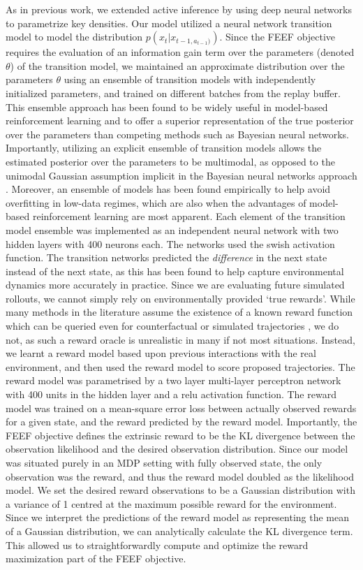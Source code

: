 As in previous work, we extended active inference by using deep neural networks to parametrize key densities. Our model utilized a neural network transition model to model the distribution $p(x_t | x_{t-1, a_{t-1})})$. Since the FEEF objective requires the evaluation of an information gain term over the parameters (denoted $\theta$) of the transition model, we maintained an approximate distribution over the parameters $\theta$ using an ensemble of transition models with independently initialized parameters, and trained on different batches from the replay buffer. This ensemble approach has been found to be widely useful in model-based reinforcement learning and to offer a superior representation of the true posterior over the parameters than competing methods such as Bayesian neural networks. Importantly, utilizing an explicit ensemble of transition models allows the estimated posterior over the parameters to be multimodal, as opposed to the unimodal Gaussian assumption implicit in the Bayesian neural networks approach \citep{tran2018Bayesian,gal2016improving}. Moreover, an ensemble of models has been found empirically to help avoid overfitting in low-data regimes, which are also when the advantages of model-based reinforcement learning are most apparent.
Each element of the transition model ensemble was implemented as an independent neural network with two hidden layers with 400 neurons each. The networks used the swish activation function. The transition networks predicted the \emph{difference} in the next state \citep{shyam_model-based_2019} instead of the next state, as this has been found to help capture environmental dynamics more accurately in practice.
Since we are evaluating future simulated rollouts, we cannot simply rely on environmentally provided `true rewards'. While many methods in the literature assume the existence of a known reward function which can be queried even for counterfactual or simulated trajectories \citep{chua_deep_2018,hafner2018learning}, we do not, as such a reward oracle is unrealistic in many if not most situations. Instead, we learnt a reward model based upon previous interactions with the real environment, and then used the reward model to score proposed trajectories. The reward model was parametrised by a two layer multi-layer perceptron network with 400 units in the hidden layer and a relu activation function. The reward model was trained on a mean-square error loss between actually observed rewards for a given state, and the reward predicted by the reward model.
Importantly, the FEEF objective defines the extrinsic reward to be the KL divergence between the observation likelihood and the desired observation distribution. Since our model was situated purely in an MDP setting with fully observed state, the only observation was the reward, and thus the reward model doubled as the likelihood model. We set the desired reward observations to be a Gaussian distribution with a variance of 1 centred at the maximum possible reward for the environment. Since we interpret the predictions of the reward model as representing the mean of a Gaussian distribution, we can analytically calculate the KL divergence term. This allowed us to straightforwardly compute and optimize the reward maximization part of the FEEF objective.
